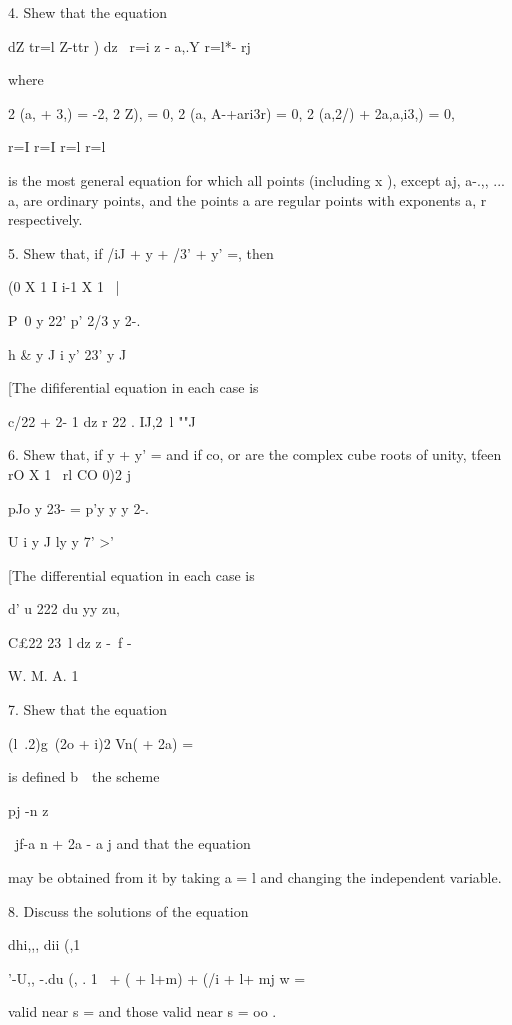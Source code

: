 4. Shew that the equation

dZ tr=l Z-ttr ) dz \ r=i z - a,.Y r=l*- rj

where

2 (a, + 3,) = -2, 2 Z), = 0, 2 (a, A-+ari3r) = 0, 2 (a,2/) + 2a,a,i3,)
= 0,

r=I r=I r=l r=l

is the most general equation for which all points (including x ),
except aj, a-.,, ... a, are ordinary points, and the points a are
regular points with exponents a, r respectively.


5. Shew that, if /iJ + y + /3' + y' =, then

(0 X 1 I i-1 X 1 ~|

P\ 0 y 22' p' 2/3 y 2-. 

h \& y J i y' 23' y J

[The dififerential equation in each case is

c/22 + 2- 1 dz r 22 . IJ,2\ l ""J

6. Shew that, if y + y' = and if co, or are the complex cube roots of
unity, tfeen rO X 1 \ rl CO 0)2 j

pJo y 23- = p'y y y 2-. 

U i y J ly y 7' >'

[The differential equation in each case is

d' u 222 du yy zu,

C£22 23\ l dz z -\ f -

W. M. A. 1

%
%

7. Shew that the equation

(l\ .2)g\ (2o + i)2 Vn( + 2a) =

is defined b\ \ the scheme

pj -n z

\ jf-a n + 2a - a j and that the equation

may be obtained from it by taking a = l and changing the independent
variable.

8. Discuss the solutions of the equation

dhi,,, dii (,1


'-U,, -.du (, . 1 \ + ( + l+m) + (/i + l+ mj w =

valid near s = and those valid near s = oo . 


